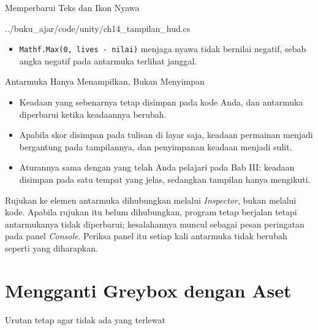 \documentclass[aspectratio=169,10pt]{beamer}
\begin{document}
\begin{frame}[fragile]{Memperbarui Teks dan Ikon Nyawa}

  {../buku_ajar/code/unity/ch14_tampilan_hud.cs}
\begin{itemize}
  \item \texttt{Mathf.Max(0, lives - nilai)} menjaga nyawa tidak bernilai
        negatif, sebab angka negatif pada antarmuka terlihat janggal.
\end{itemize}
\end{frame}

\begin{frame}{Antarmuka Hanya Menampilkan, Bukan Menyimpan}
\begin{itemize}
  \item Keadaan yang sebenarnya tetap disimpan pada kode Anda, dan antarmuka
        diperbarui ketika keadaannya berubah.
  \item Apabila skor disimpan pada tulisan di layar saja, keadaan permainan
        menjadi bergantung pada tampilannya, dan penyimpanan keadaan menjadi
        sulit.
  \item Aturannya sama dengan yang telah Anda pelajari pada Bab III: keadaan
        disimpan pada satu tempat yang jelas, sedangkan tampilan hanya
        mengikuti.
\end{itemize}
\vspace{0.12cm}
\begin{peringatan}
Rujukan ke elemen antarmuka dihubungkan melalui \emph{Inspector}, bukan melalui
kode. Apabila rujukan itu belum dihubungkan, program tetap berjalan tetapi
antarmukanya tidak diperbarui; kesalahannya muncul sebagai pesan peringatan
pada panel \emph{Console}. Periksa panel itu setiap kali antarmuka tidak
berubah seperti yang diharapkan.
\end{peringatan}
\end{frame}

\section{Mengganti Greybox dengan Aset}
  {Urutan tetap agar tidak ada yang terlewat}
\end{document}
